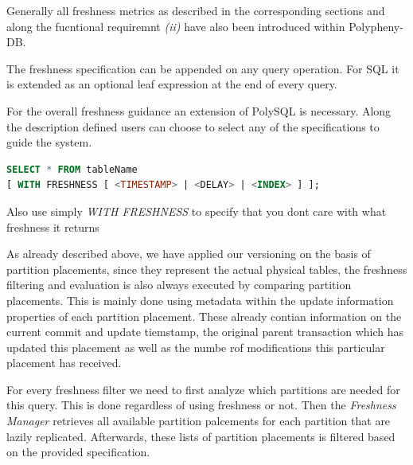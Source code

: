 Generally all freshness metrics as described in the corresponding sections and along the fucntional requiremnt \textit{(ii)} have also been introduced within Polypheny-DB.

The freshness specification can be appended on any query operation.
For SQL it is extended as an optional leaf expression at the end of every query. 

For the overall freshness guidance an extension of PolySQL is necessary.
Along the description defined users can choose to select any of the specifications to guide the system.
\begin{lstlisting}[language=sql]
SELECT * FROM tableName 
[ WITH FRESHNESS [ <TIMESTAMP> | <DELAY> | <INDEX> ] ];
\end{lstlisting}

Also use simply \emph{WITH FRESHNESS} to specify that you dont care with what freshness it returns


As already described above, we have applied our versioning on the basis of partition placements, since they represent the actual physical tables,
the freshness filtering and evaluation is also always executed by comparing partition placements. 
This is mainly done using metadata within the update information properties of each partition placement. These already contian information on the current commit and update tiemstamp,
the original parent transaction which has updated this placement as well as the numbe rof modifications this particular placement has received.

For every freshness filter we need to first analyze which partitions are needed for this query. This is done regardless of using freshness or not.
Then the \textit{Freshness Manager} retrieves all available partition palcements for each partition that are lazily replicated.
Afterwards, these lists of partition placements is filtered based on the provided specification.



